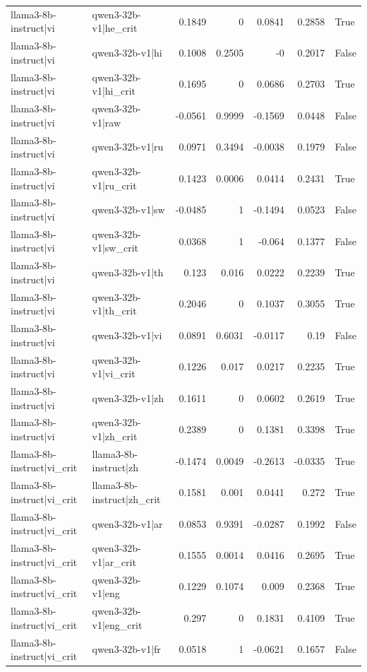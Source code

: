 \begin{table}
\begin{tabular}{l l r r r r l}
llama3-8b-instruct|vi & qwen3-32b-v1|he_crit & 0.1849 & 0 & 0.0841 & 0.2858 & True \\
llama3-8b-instruct|vi & qwen3-32b-v1|hi & 0.1008 & 0.2505 & -0 & 0.2017 & False \\
llama3-8b-instruct|vi & qwen3-32b-v1|hi_crit & 0.1695 & 0 & 0.0686 & 0.2703 & True \\
llama3-8b-instruct|vi & qwen3-32b-v1|raw & -0.0561 & 0.9999 & -0.1569 & 0.0448 & False \\
llama3-8b-instruct|vi & qwen3-32b-v1|ru & 0.0971 & 0.3494 & -0.0038 & 0.1979 & False \\
llama3-8b-instruct|vi & qwen3-32b-v1|ru_crit & 0.1423 & 0.0006 & 0.0414 & 0.2431 & True \\
llama3-8b-instruct|vi & qwen3-32b-v1|sw & -0.0485 & 1 & -0.1494 & 0.0523 & False \\
llama3-8b-instruct|vi & qwen3-32b-v1|sw_crit & 0.0368 & 1 & -0.064 & 0.1377 & False \\
llama3-8b-instruct|vi & qwen3-32b-v1|th & 0.123 & 0.016 & 0.0222 & 0.2239 & True \\
llama3-8b-instruct|vi & qwen3-32b-v1|th_crit & 0.2046 & 0 & 0.1037 & 0.3055 & True \\
llama3-8b-instruct|vi & qwen3-32b-v1|vi & 0.0891 & 0.6031 & -0.0117 & 0.19 & False \\
llama3-8b-instruct|vi & qwen3-32b-v1|vi_crit & 0.1226 & 0.017 & 0.0217 & 0.2235 & True \\
llama3-8b-instruct|vi & qwen3-32b-v1|zh & 0.1611 & 0 & 0.0602 & 0.2619 & True \\
llama3-8b-instruct|vi & qwen3-32b-v1|zh_crit & 0.2389 & 0 & 0.1381 & 0.3398 & True \\
llama3-8b-instruct|vi_crit & llama3-8b-instruct|zh & -0.1474 & 0.0049 & -0.2613 & -0.0335 & True \\
llama3-8b-instruct|vi_crit & llama3-8b-instruct|zh_crit & 0.1581 & 0.001 & 0.0441 & 0.272 & True \\
llama3-8b-instruct|vi_crit & qwen3-32b-v1|ar & 0.0853 & 0.9391 & -0.0287 & 0.1992 & False \\
llama3-8b-instruct|vi_crit & qwen3-32b-v1|ar_crit & 0.1555 & 0.0014 & 0.0416 & 0.2695 & True \\
llama3-8b-instruct|vi_crit & qwen3-32b-v1|eng & 0.1229 & 0.1074 & 0.009 & 0.2368 & True \\
llama3-8b-instruct|vi_crit & qwen3-32b-v1|eng_crit & 0.297 & 0 & 0.1831 & 0.4109 & True \\
llama3-8b-instruct|vi_crit & qwen3-32b-v1|fr & 0.0518 & 1 & -0.0621 & 0.1657 & False \\

\end{tabular}
\end{table}
